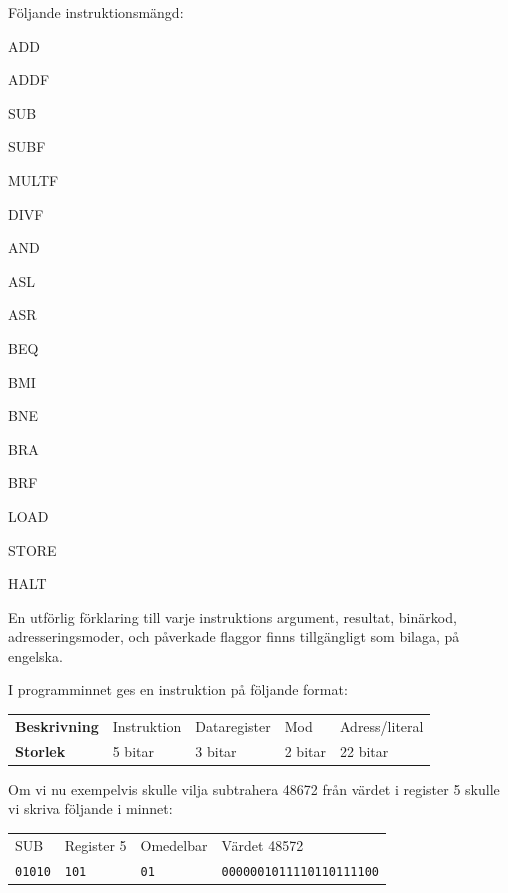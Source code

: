 \documentclass[]{article}
\begin{document}
\noindent
Följande instruktionsmängd:

\begin{multicols}{5}
\begin{itemize*}
\item ADD
\item ADDF
\item SUB
\item SUBF
\item MULTF
\item DIVF
\item AND
\item ASL
\item ASR
\item BEQ
\item BMI
\item BNE
\item BRA
\item BRF
\item LOAD
\item STORE
\item HALT
\end{itemize*}
\end{multicols}

\noindent
En utförlig förklaring till varje instruktions argument, resultat, binärkod, adresseringsmoder, och påverkade flaggor finns tillgängligt som bilaga, på engelska.

I programminnet ges en instruktion på följande format:

\bigskip
\begin{tabular}{l|llll}
\textbf{Beskrivning} & Instruktion & Dataregister & Mod & Adress/literal \\
\textbf{Storlek} & 5 bitar & 3 bitar & 2 bitar & 22 bitar \\
\end{tabular}
\bigskip

\noindent
Om vi nu exempelvis skulle vilja subtrahera 48672 från värdet i register 5 skulle vi skriva följande i minnet:

\bigskip
\begin{tabular}{llll}
SUB & Register 5 & Omedelbar & Värdet 48572 \\
\texttt{01010} & \texttt{101} & \texttt{01} &  \texttt{0000001011110110111100}
\end{tabular}
\bigskip
\end{document}
